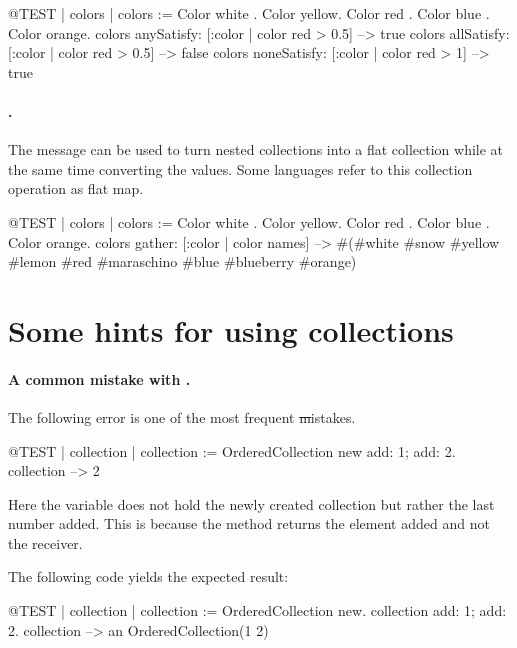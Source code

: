 \documentclass[a4paper,10pt,twoside]{book}
\begin{document}
\begin{code}{@TEST | colors | colors := {Color white . Color yellow. Color red . Color blue . Color orange}.}
colors anySatisfy: [:color | color red > 0.5] --> true
colors allSatisfy: [:color | color red > 0.5] --> false
colors noneSatisfy: [:color | color red > 1] --> true
\end{code}

\paragraph{.}
The message  can be used to turn nested collections into a flat collection while at the same time converting the values. Some languages refer to this collection operation as flat map.

\begin{code}{@TEST | colors | colors := {Color white . Color yellow. Color red . Color blue . Color orange}.}
colors gather: [:color | color names] --> #(#white #snow #yellow #lemon #red #maraschino #blue #blueberry #orange)
\end{code}

\section{Some hints for using collections}

\paragraph{A common mistake with .}
The following error is one of the most frequent \st mistakes.

\begin{code}{@TEST | collection | }
collection := OrderedCollection new add: 1; add: 2.
collection --> 2
\end{code}
\noindent
Here the variable  does not hold the newly created collection but rather the last number added.
This is because the method  returns the element added and not the receiver.

The following code yields the expected result:
\begin{code}{@TEST | collection |}
collection := OrderedCollection new.
collection add: 1; add: 2.
collection --> an OrderedCollection(1 2)
\end{code}
\end{document}
